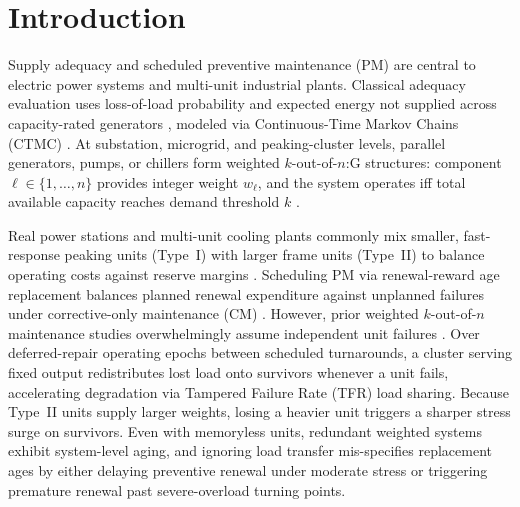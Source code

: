 \documentclass{elektr}
\begin{document}
\section{Introduction}
\label{sec:intro}

Supply adequacy and scheduled preventive maintenance (PM) are central to electric power systems and multi-unit industrial plants. Classical adequacy evaluation uses loss-of-load probability and expected energy not supplied across capacity-rated generators \cite{rts1979,grigg1999,billinton1996,billinton1994}, modeled via Continuous-Time Markov Chains (CTMC) \cite{lisnianski2012,ding2009}. At substation, microgrid, and peaking-cluster levels, parallel generators, pumps, or chillers form weighted $k$-out-of-$n$:G structures: component $\ell \in \{1, \dots, n\}$ provides integer weight $w_\ell$, and the system operates iff total available capacity reaches demand threshold $k$ \cite{wu1994,kuo2003,rushdi2018}.

Real power stations and multi-unit cooling plants commonly mix smaller, fast-response peaking units (Type~I) with larger frame units (Type~II) to balance operating costs against reserve margins \cite{eryilmaz2014two,eryilmaz2018,qi2024}. Scheduling PM via renewal-reward age replacement balances planned renewal expenditure against unplanned failures under corrective-only maintenance (CM) \cite{barlow1965,nakagawa1985,nakagawa2005,wang2006}. However, prior weighted $k$-out-of-$n$ maintenance studies overwhelmingly assume independent unit failures \cite{hamdan2021,qi2024}. Over deferred-repair operating epochs between scheduled turnarounds, a cluster serving fixed output redistributes lost load onto survivors whenever a unit fails, accelerating degradation via Tampered Failure Rate (TFR) load sharing. Because Type~II units supply larger weights, losing a heavier unit triggers a sharper stress surge on survivors. Even with memoryless units, redundant weighted systems exhibit system-level aging, and ignoring load transfer mis-specifies replacement ages by either delaying preventive renewal under moderate stress or triggering premature renewal past severe-overload turning points.
\end{document}

